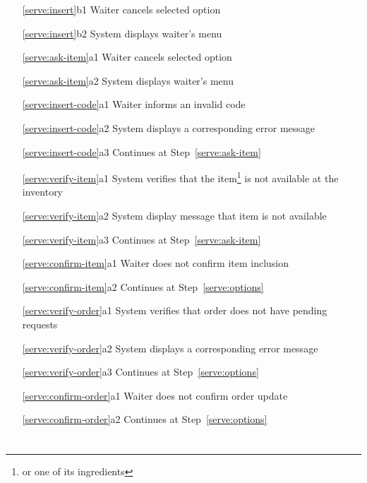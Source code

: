 \documentclass[a4paper,11pt,oneside]{book}
\newcommand{\cancel}[1]{#1 cancels selected option}
\newcommand{\menu}[1]{System displays #1's menu}
\newcommand{\goto}[1]{Continues at Step~\ref{#1}}
\begin{document}
\begin{enumerate}
  \item [\ref{serve:insert}b1] \cancel{Waiter}
  \item [\ref{serve:insert}b2] \menu{waiter}
    \\
  \item [\ref{serve:ask-item}a1] \cancel{Waiter}
  \item [\ref{serve:ask-item}a2] \menu{waiter}
    \\
  \item [\ref{serve:insert-code}a1] Waiter informs an invalid code
  \item [\ref{serve:insert-code}a2] System displays a corresponding error message
  \item [\ref{serve:insert-code}a3] \goto{serve:ask-item}
    \\
  \item [\ref{serve:verify-item}a1] System verifies that the item\footnote{or one of its ingredients} is not available at the inventory
  \item [\ref{serve:verify-item}a2] System display message that item is not available
  \item [\ref{serve:verify-item}a3] \goto{serve:ask-item}
    \\
  \item [\ref{serve:confirm-item}a1] Waiter does not confirm item inclusion
  \item [\ref{serve:confirm-item}a2] \goto{serve:options}
    \\
  \item [\ref{serve:verify-order}a1] System verifies that order does not have pending requests
  \item [\ref{serve:verify-order}a2] System displays a corresponding error message
  \item [\ref{serve:verify-order}a3] \goto{serve:options}
    \\
  \item [\ref{serve:confirm-order}a1] Waiter does not confirm order update
  \item [\ref{serve:confirm-order}a2] \goto{serve:options}
\end{enumerate}

\chapter{}
\end{document}
